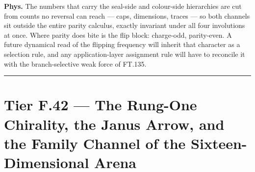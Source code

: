 \begin{theorem}
\textbf{Phys.} The numbers that carry the seal-side and colour-side hierarchies are cut from counts no reversal can reach — caps, dimensions, traces — so both channels sit outside the entire parity calculus, exactly invariant under all four involutions at once. Where parity does bite is the flip block: charge-odd, parity-even. A future dynamical read of the flipping frequency will inherit that character as a selection rule, and any application-layer assignment rule will have to reconcile it with the branch-selective weak force of FT.135.

\vspace{2pt}\noindent\rule{\textwidth}{0.4pt}\vspace{2pt}

\end{theorem}

\section[Tier F.42 — The Rung-One Chirality, the Janus Arrow, and…]{\texorpdfstring{Tier F.42 — The Rung-One Chirality, the Janus Arrow, and the Family Channel of the Sixteen-Dimensional Arena}{Tier F.42 - The Rung-One Chirality, the Janus Arrow, and the Family Channel of the Sixteen-Dimensional Arena}}

